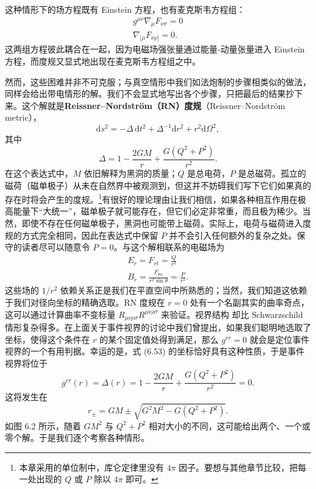 这种情形下的场方程既有 Einstein 方程，也有麦克斯韦方程组：
\begin{gather*}
g^{\mu\nu}\nabla_{\mu}F_{\nu\sigma} = 0\\
\nabla_{[\mu}F_{\nu\rho]} = 0.
\tag{6.52}
\end{gather*}
这两组方程彼此耦合在一起，因为电磁场强张量通过能量-动量张量进入 Einstein 方程，而度规又显式地出现在麦克斯韦方程组之中。

然而，这些困难并非不可克服；与真空情形中我们如法炮制的步骤相类似的做法，同样会给出带电情形的解。我们不会显式地写出各个步骤，只把最后的结果抄下来。这个解就是\textbf{Reissner–Nordström（RN）度规}（Reissner–Nordström metric），
\begin{equation*}
\boxed{\,\mathrm{d}s^{2} = -\Delta\,\mathrm{d}t^{2} + \Delta^{-1}\mathrm{d}r^{2} + r^{2}\mathrm{d}\Omega^{2},\,}
\tag{6.53}
\end{equation*}
其中
\begin{equation*}
\Delta = 1 - \frac{2GM}{r} + \frac{G(Q^{2}+P^{2})}{r^{2}}.
\tag{6.54}
\end{equation*}
在这个表达式中，$M$ 依旧解释为黑洞的质量；$Q$ 是总电荷，$P$ 是总磁荷。孤立的磁荷（磁单极子）从未在自然界中被观测到，但这并不妨碍我们写下它们如果真的存在时将会产生的度规。\footnote{本章采用的单位制中，库仑定律里没有 $4\pi$ 因子。要想与其他章节比较，把每一处出现的 $Q$ 或 $P$ 除以 $4\pi$ 即可。}有很好的理论理由让我们相信，如果各种相互作用在极高能量下“大统一”，磁单极子就可能存在，但它们必定非常重，而且极为稀少。当然，即使不存在任何磁单极子，黑洞也可能带上磁荷。实际上，电荷与磁荷进入度规的方式完全相同，因此在表达式中保留 $P$ 并不会引入任何额外的复杂之处。保守的读者尽可以随意令 $P=0$。与这个解相联系的电磁场为
\begin{gather*}
E_{r} = F_{rt} = \frac{Q}{r^{2}}\\
B_{r} = \frac{F_{\theta\phi}}{r^{2}\sin\theta} = \frac{P}{r^{2}}.
\tag{6.55}
\end{gather*}
这些场的 $1/r^{2}$ 依赖关系正是我们在平直空间中所熟悉的；当然，我们知道这依赖于我们对径向坐标的精确选取。RN 度规在 $r=0$ 处有一个名副其实的曲率奇点，这可以通过计算曲率不变标量 $R_{\mu\nu\rho\sigma}R^{\mu\nu\rho\sigma}$ 来验证。视界结构
却比 Schwarzschild 情形复杂得多。在上面关于事件视界的讨论中我们曾提出，如果我们聪明地选取了坐标，使得这个条件在 $r$ 的某个固定值处得到满足，那么 $g^{rr}=0$ 就会是定位事件视界的一个有用判据。幸运的是，式 (6.53) 的坐标恰好具有这种性质，于是事件视界将位于
\begin{equation*}
g^{rr}(r) = \Delta(r) = 1 - \frac{2GM}{r} + \frac{G(Q^{2}+P^{2})}{r^{2}} = 0.
\tag{6.56}
\end{equation*}
这将发生在
\begin{equation*}
r_{\pm} = GM \pm \sqrt{G^{2}M^{2} - G(Q^{2}+P^{2})}.
\tag{6.57}
\end{equation*}
如图 6.2 所示，随着 $GM^{2}$ 与 $Q^{2}+P^{2}$ 相对大小的不同，这可能给出两个、一个或零个解。于是我们逐个考察各种情形。

